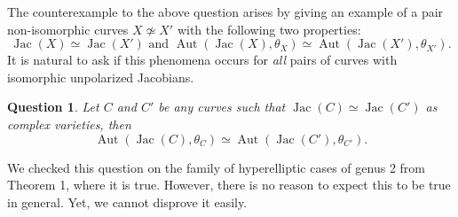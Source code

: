 \documentclass[12pt,reqno]{amsart}
\DeclareMathOperator{\Aut}{Aut}
\DeclareMathOperator{\Jac}{Jac}
\newtheorem*{question}{Question}
\theoremstyle{definition}
\theoremstyle{remark}
\begin{document}
The counterexample to the above question arises by giving an example of a pair non-isomorphic curves $X \nsimeq X'$ with the following two properties: $$\Jac(X) \simeq \Jac(X') \text{  and  }  \Aut(\Jac(X), \theta_X) \simeq \Aut(\Jac(X'), \theta_{X'}).$$ It is natural to ask if this phenomena occurs for \textit{all} pairs of curves with isomorphic unpolarized Jacobians. %

\begin{question} Let $C$ and $C'$ be any curves such that $\Jac(C) \simeq \Jac(C')$ as complex varieties, then $$\Aut(\Jac(C), \theta_C) \simeq \Aut(\Jac(C'), \theta_{C'}).$$  \end{question} 

We checked this question on the family of hyperelliptic cases of genus 2 from \cite{howe1} Theorem 1, where it is true. However, there is no reason to expect this to be true in general. Yet, we cannot disprove it easily. 
\end{document}
